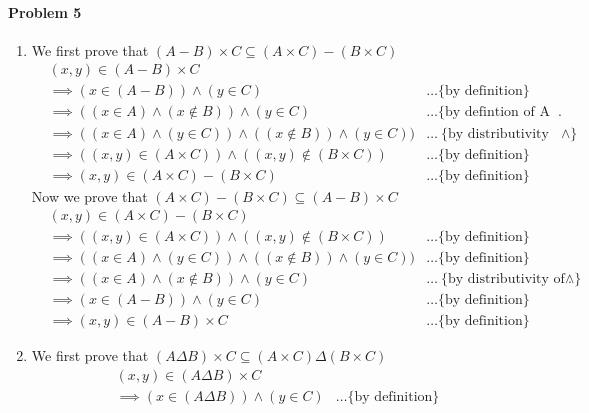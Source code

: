 \documentclass[12pt]{scrartcl}
\begin{document}
\paragraph*{Problem 5}
\begin{enumerate}
    \item We first prove that $(A - B) \times C \subseteq (A \times C) - (B \times C)$
    \begin{align*}
        & (x,y) \in (A - B) \times C & 
        \\ & \implies (x \in (A - B)) \land (y \in C) & \ldots \text{\{by definition\}}
        \\ & \implies ((x \in A) \land (x \notin B)) \land (y \in C) & \ldots \text{\{by defintion of A - B\}}.
        \\ & \implies ((x \in A ) \land (y \in C)) \land  ((x \notin B)) \land (y \in C)) & \ldots \text{\{by distributivity of $\land$\}}
        \\ & \implies ((x,y) \in (A \times C)) \land ((x,y) \notin (B \times C))  & \ldots \text{\{by definition\}}
        \\ & \implies (x,y) \in (A \times C) - (B \times C) & \ldots \text{\{by definition\}}
    \end{align*}
    Now we prove that $(A \times C) - (B \times C) \subseteq (A - B) \times C$
    \begin{align*}
        & (x,y) \in (A \times C) - (B \times C) & 
        \\ & \implies ((x,y) \in (A \times C)) \land ((x,y) \notin (B \times C))  & \ldots \text{\{by definition\}}
        \\ & \implies ((x \in A ) \land (y \in C)) \land  ((x \notin B)) \land (y \in C)) & \ldots \text{\{by definition\}}
        \\ & \implies ((x \in A) \land (x \notin B)) \land (y \in C) & \ldots \text{\{by distributivity of $\land$\}}.
        \\ & \implies (x \in (A - B)) \land (y \in C) & \ldots \text{\{by definition\}}
        \\ & \implies (x,y) \in (A - B) \times C & \ldots \text{\{by definition\}}
    \end{align*}
    \item We first prove that $(A \Delta B) \times C \subseteq (A \times C) \Delta (B \times C)$
    \begin{align*}
        & (x,y) \in (A \Delta B) \times C & 
        \\ & \implies (x \in (A \Delta B)) \land (y \in C) & \ldots \text{\{by definition\}}

\end{align*}
\end{enumerate}
\end{document}
